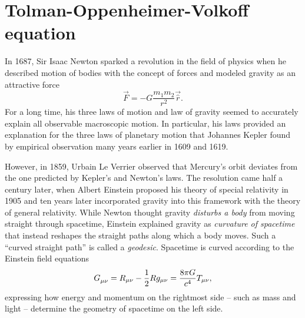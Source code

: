 \chapter{Tolman-Oppenheimer-Volkoff equation}
\label{chap:tov}

In 1687, Sir Isaac Newton sparked a revolution in the field of physics when he described motion of bodies with the concept of forces and modeled gravity as an attractive force
\cite{ref:newton}
\begin{equation*}
	\vec{F} = - G \frac{m_1 m_2}{r^2} \vec{\hat{r}} .
\end{equation*}
For a long time, his three laws of motion and law of gravity seemed to accurately explain all observable macroscopic motion.
In particular, his laws provided an explanation for the three laws of planetary motion that Johannes Kepler found by empirical observation many years earlier in 1609 and 1619. \cite{ref:kepler1,ref:kepler2} 

However, in 1859, Urbain Le Verrier observed that Mercury's orbit deviates from the one predicted by Kepler's and Newton's laws. \cite{ref:le_verrier}
The resolution came half a century later, when Albert Einstein proposed his theory of special relativity in 1905 and ten years later incorporated gravity into this framework with the theory of general relativity. \cite{ref:einstein_special,ref:einstein_general}
While Newton thought gravity \emph{disturbs a body} from moving straight through spacetime, Einstein explained gravity as \emph{curvature of spacetime} that instead reshapes the straight paths along which a body moves.
Such a ``curved straight path'' is called a \emph{geodesic}.
Spacetime is curved according to the Einstein field equations
\begin{equation*}
	G\indices{_\mu_\nu} = R_{\mu \nu} - \frac{1}{2} R g_{\mu \nu} = \frac{8 \pi G}{c^4} T_{\mu \nu} ,
\end{equation*}
expressing how energy and momentum on the rightmost side -- such as mass and light -- determine the geometry of spacetime on the left side.


